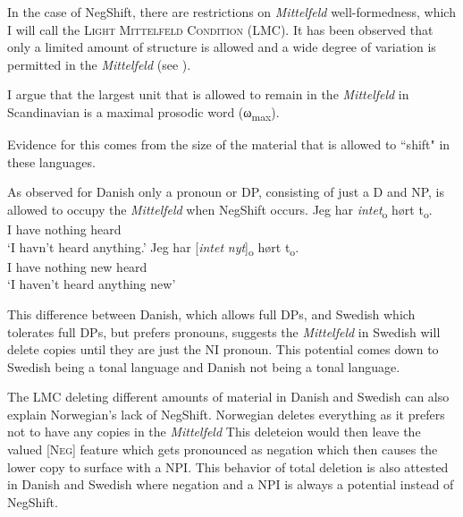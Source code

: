 \documentclass[12pt, letterpaper]{article}
\newcommand{\sub}[1]{\textsubscript{#1}}
\begin{document}
\ex In the case of NegShift, there are restrictions on \emph{Mittelfeld} well-formedness, which I will call the \textsc{Light Mittelfeld Condition} (LMC).
	\ea It has been observed that only a limited amount of structure is allowed and a wide degree of variation is permitted in the \emph{Mittelfeld} (see \cite{haiderMittelfeldPhenomenaScrambling2017}). 

	\ex I argue that the largest unit that is allowed to remain in the \emph{Mittelfeld} in Scandinavian is a maximal prosodic word (ω\sub{max}).
	\z 

\ex Evidence for this comes from the size of the material that is allowed to ``shift" in these languages. 

\ex As observed for Danish only a pronoun or DP, consisting of just a D and NP, is allowed to occupy the \emph{Mittelfeld} when NegShift occurs. 
	\ea 
	\gll Jeg har \textit{intet}\textsubscript{o} hørt t\textsubscript{o}.\\
	I have nothing heard\\
	\glt  `I havn't heard anything.'
	\ex 
	\gll Jeg har [\textit{intet} \textit{nyt}]\textsubscript{o} hørt t\textsubscript{o}.\\
	I have nothing new heard\\
	\glt `I haven't heard anything new'
	\z  	

\ex This difference between Danish, which allows full DPs, and Swedish which tolerates full DPs, but prefers pronouns, suggests the \emph{Mittelfeld} in Swedish will delete copies until they are just the NI pronoun. 
	\ea This potential comes down to Swedish being a tonal language and Danish not being a tonal language.
	\z 

\ex The LMC deleting different amounts of material in Danish and Swedish can also explain Norwegian's lack of NegShift. 
	\ea Norwegian deletes everything as it prefers not to have any copies in the \emph{Mittelfeld}
	\ex This deleteion would then leave the valued [\textsc{Neg}] feature which gets pronounced as negation which then causes the lower copy to surface with a NPI.  
	\ex This behavior of total deletion is also attested in Danish and Swedish where negation and a NPI is always a potential instead of NegShift.
	\z  
\end{document}
